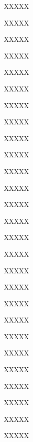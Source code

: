 \documentclass[11pt,a4paper]{book}
\begin{document}
	
\begin{greek}
	
\beginnumbering
\numberpstarttrue
	
\pstart{}XXXXX\pend

\pstart{}XXXXX\pend

\pstart{}XXXXX\pend

\pstart{}XXXXX\pend

\pstart{}XXXXX\pend

\pstart{}XXXXX\pend

\pstart{}XXXXX\pend

\pstart{}XXXXX\pend

\pstart{}XXXXX\pend

\pstart{}XXXXX\pend

\pstart{}XXXXX\pend

\pstart{}XXXXX\pend

\pstart{}XXXXX\pend

\pstart{}XXXXX\pend

\pstart{}XXXXX\pend

\pstart{}XXXXX\pend

\pstart{}XXXXX\pend

\pstart{}XXXXX\pend

\pstart{}XXXXX\pend

\pstart{}XXXXX\pend

\pstart{}XXXXX\pend

\pstart{}XXXXX\pend

\pstart{}XXXXX\pend

\pstart{}XXXXX\pend

\pstart{}XXXXX\pend

\pstart{}XXXXX\pend

\pstart{}XXXXX\pend


\end{greek}
\end{document}
